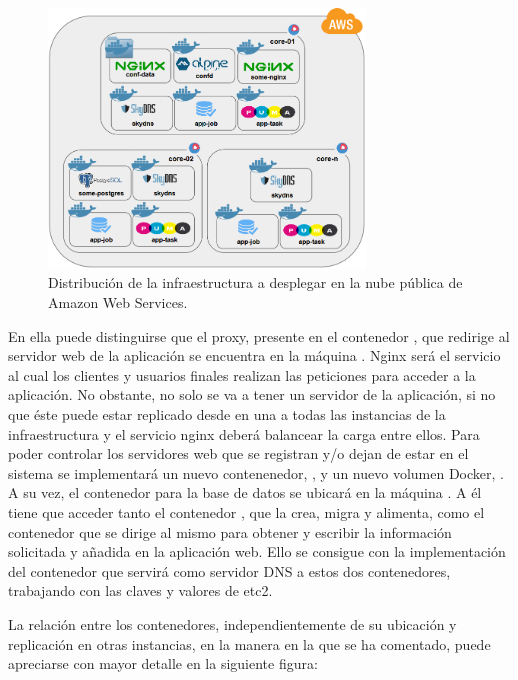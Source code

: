 \begin{figure}[H]
\centering
\includegraphics[width=0.75\textwidth]{images/figures/aws-1-iteration.png}
\caption{Distribución de la infraestructura a desplegar en la nube pública de Amazon Web Services.}
\end{figure}

En ella puede distinguirse que el proxy, presente en el contenedor , que redirige al servidor web de la aplicación se encuentra en la máquina . Nginx será el servicio al cual los clientes y usuarios finales realizan las peticiones para acceder a la aplicación. No obstante, no solo se va a tener un servidor de la aplicación, si no que éste puede estar replicado desde en una a todas las instancias de la infraestructura y el servicio nginx deberá balancear la carga entre ellos. Para poder controlar los servidores web que se registran y/o dejan de estar en el sistema se implementará un nuevo contenenedor, , y un nuevo volumen Docker, . A su vez, el contenedor  para la base de datos se ubicará en la máquina . A él tiene que acceder tanto el contenedor , que la crea, migra y alimenta, como el contenedor  que se dirige al mismo para obtener y escribir la información solicitada y añadida en la aplicación web. Ello se consigue con la implementación del contenedor  que servirá como servidor DNS a estos dos contenedores, trabajando con las claves y valores de etc2.

La relación entre los contenedores, independientemente de su ubicación y replicación en otras instancias, en la manera en la que se ha comentado, puede apreciarse con mayor detalle en la siguiente figura:

